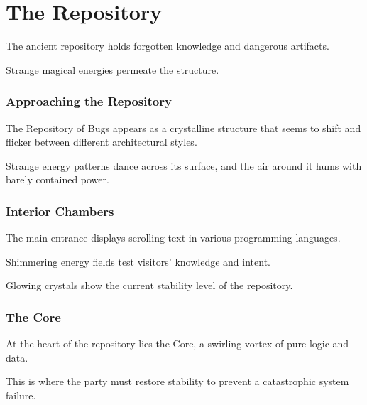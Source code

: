 \documentclass[letterpaper, 11pt, bg=full, twocolumn, stats=modern]{dndbook}
\begin{document}
\setcounter{chapter}{1}
\chapter{The Repository}\label{ch:001}

The ancient repository holds forgotten knowledge and dangerous artifacts.

Strange magical energies permeate the structure.

\subsection{Approaching the Repository}

The Repository of Bugs appears as a crystalline structure that seems to shift and flicker between different architectural styles.

Strange energy patterns dance across its surface, and the air around it hums with barely contained power.

\subsection{Interior Chambers}

The main entrance displays scrolling text in various programming languages.

Shimmering energy fields test visitors' knowledge and intent.

Glowing crystals show the current stability level of the repository.

\subsection{The Core}

At the heart of the repository lies the Core, a swirling vortex of pure logic and data.

This is where the party must restore stability to prevent a catastrophic system failure.
\end{document}
